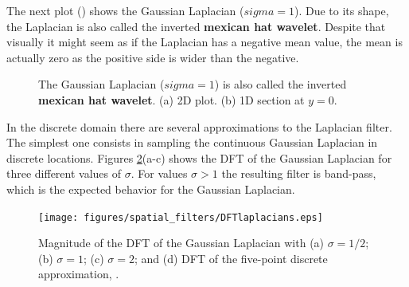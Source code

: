 The next plot (\fig{\ref{fig:mexican_hat_wavelet}}) shows the Gaussian Laplacian ($sigma = 1$). Due to its shape, the Laplacian is also called the inverted {\bf mexican hat wavelet}. Despite that visually it might seem as if the Laplacian has a negative mean value, the mean is actually zero as the positive side is wider than the negative. 

\begin{figure}[h]
\centerline{
}
\caption{The Gaussian Laplacian ($sigma = 1$) is also called the inverted {\bf mexican hat wavelet}. (a) 2D plot. (b) 1D section at $y=0$.}
\label{fig:mexican_hat_wavelet}
\end{figure}



In the discrete domain there are several approximations to the Laplacian filter. The simplest one consists in sampling the continuous Gaussian Laplacian in discrete locations. 
Figures {\ref{fig:DFTlaplacians}}(a-c) shows the DFT of the Gaussian Laplacian for three different values of $\sigma$. For values $\sigma>1$ the resulting filter is band-pass, which is the expected behavior for the Gaussian Laplacian. %

\begin{figure}[h!]
\centerline{
\texttt{[image: figures/spatial\_filters/DFTlaplacians.eps]}}
\caption{Magnitude of the DFT of the Gaussian Laplacian with (a) $\sigma=1/2$; (b) $\sigma=1$; (c) $\sigma=2$; and (d) DFT of the five-point discrete approximation, \eqn{\ref{eq:five_point_laplacian}}.
} 
\label{fig:DFTlaplacians}
\end{figure}

